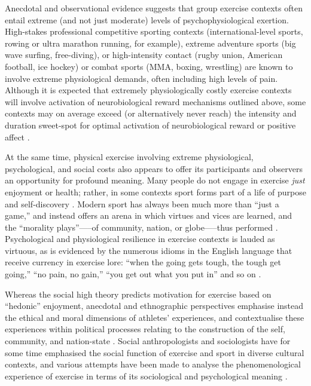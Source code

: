 \begin{CJK}{UTF8}{gbsn}
Anecdotal and observational evidence suggests that group exercise contexts often entail extreme (and not just moderate) levels of psychophysiological exertion.  High-stakes professional competitive sporting contexts (international-level sports, rowing or ultra marathon running, for example), extreme adventure sports (big wave surfing, free-diving), or high-intensity contact (rugby union, American football, ice hockey) or combat sports (MMA, boxing, wrestling) are known to involve extreme physiological demands, often including high levels of pain.  Although it is expected that extremely physiologically costly exercise contexts will involve activation of neurobiological reward mechanisms outlined above, some contexts may on average exceed (or alternatively never reach) the intensity and duration sweet-spot for optimal activation of neurobiological reward \citep{Raichlen2013} or positive affect \citep{Ekkekakis2011,Reed2006}.

At the same time, physical exercise involving extreme physiological, psychological, and social costs also appears to offer its participants and observers an opportunity for profound meaning.  Many people do not engage in exercise \textit{just} enjoyment or health; rather, in some contexts sport forms part of a life of purpose and self-discovery \citep[see, for example][]{Jackson1995,Jones2004,White2011}.  Modern sport has always been much more than ``just a game,'' and instead offers an arena in which virtues and vices are learned, and the ``morality plays''—--of community, nation, or globe—--thus performed \citep{Elias1986,McNamee2008}.  Psychological and physiological resilience in exercise contexts is lauded as virtuous, as is evidenced by the numerous idioms in the English language that receive currency in exercise lore: ``when the going gets tough, the tough get going,'' ``no pain, no gain,'' ``you get out what you put in'' and so on \citep{Sarkar2014}.

Whereas the social high theory predicts motivation for exercise based on ``hedonic'' enjoyment, anecdotal and ethnographic perspectives emphasise instead the ethical and moral dimensions of athletes' experiences, and contextualise these experiences within political processes relating to the construction of the self, community, and nation-state \citep{Alter1993,Brownell1995,Downey2005,Wacquant2004}.
Social anthropologists and sociologists have for some time emphasised the social function of exercise and sport in diverse cultural contexts, and various attempts have been made to analyse the phenomenological experience of exercise in terms of its sociological and psychological meaning \citep{Bourdieu1978}.


\end{CJK}
